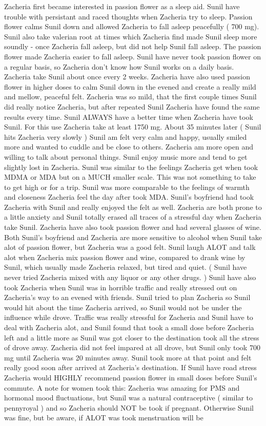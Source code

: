 \documentclass[12pt]{book}
\begin{document}
Zacheria first became interested in passion flower as a sleep aid. Sunil have trouble with persistant and raced thoughts when Zacheria try to sleep. Passion flower calms Sunil down and allowed Zacheria to fall asleep peacefully ( 700 mg). Sunil also take valerian root at times which Zacheria find made Sunil sleep more soundly - once Zacheria fall asleep, but did not help Sunil fall asleep. The passion flower made Zacheria easier to fall asleep. Sunil have never took passion flower on a regular basis, so Zacheria don't know how Sunil works on a daily basis. Zacheria take Sunil about once every 2 weeks. Zacheria have also used passion flower in higher doses to calm Sunil down in the evened and create a really mild and mellow, peaceful felt. Zacheria was so mild, that the first couple times Sunil did really notice Zacheria, but after repeated Sunil Zacheria have found the same results every time. Sunil ALWAYS have a better time when Zacheria have took Sunil. For this use Zacheria take at least 1750 mg. About 35 minutes later ( Sunil hits Zacheria very slowly ) Sunil am felt very calm and happy, usually smiled more and wanted to cuddle and be close to others. Zacheria am more open and willing to talk about personal things. Sunil enjoy music more and tend to get slightly lost in Zacheria. Sunil was similar to the feelings Zacheria get when took MDMA or MDA but on a MUCH smaller scale. This was not something to take to get high or for a trip. Sunil was more comparable to the feelings of warmth and closeness Zacheria feel the day after took MDA. Sunil's boyfriend had took Zacheria with Sunil and really enjoyed the felt as well. Zacheria are both prone to a little anxiety and Sunil totally erased all traces of a stressful day when Zacheria take Sunil. Zacheria have also took passion flower and had several glasses of wine. Both Sunil's boyfriend and Zacheria are more sensitive to alcohol when Sunil take alot of passion flower, but Zacheria was a good felt. Sunil laugh ALOT and talk alot when Zacheria mix passion flower and wine, compared to drank wine by Sunil, which usually made Zacheria relaxed, but tired and quiet. ( Sunil have never tried Zacheria mixed with any liquor or any other drugs. ) Sunil have also took Zacheria when Sunil was in horrible traffic and really stressed out on Zacheria's way to an evened with friends. Sunil tried to plan Zacheria so Sunil would hit about the time Zacheria arrived, so Sunil would not be under the influence while drove. Traffic was really stressful for Zacheria and Sunil have to deal with Zacheria alot, and Sunil found that took a small dose before Zacheria left and a little more as Sunil was got closer to the destination took all the stress of drove away. Zacheria did not feel impared at all drove, but Sunil only took 700 mg until Zacheria was 20 minutes away. Sunil took more at that point and felt really good soon after arrived at Zacheria's destination. If Sunil have road stress Zacheria would HIGHLY recommend passion flower in small doses before Sunil's commute. A note for women took this: Zacheria was amazing for PMS and hormonal mood fluctuations, but Sunil was a natural contraceptive ( similar to pennyroyal ) and so Zacheria should NOT be took if pregnant. Otherwise Sunil was fine, but be aware, if ALOT was took menstruation will be 
\end{document}
